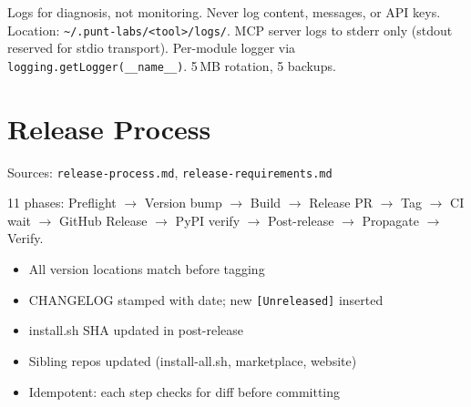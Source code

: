 \documentclass[a4paper,10pt]{article}
\begin{document}
Logs for diagnosis, not monitoring. Never log content, messages, or API keys.
Location: \texttt{\textasciitilde/.punt-labs/<tool>/logs/}. MCP server logs to
stderr only (stdout reserved for stdio transport). Per-module logger via
\texttt{logging.getLogger(\_\_name\_\_)}. 5\,MB rotation, 5 backups.

\section{Release Process}
\label{sec:release}
Sources: \texttt{release-process.md}, \texttt{release-requirements.md}

11 phases: Preflight $\to$ Version bump $\to$ Build $\to$ Release PR $\to$
Tag $\to$ CI wait $\to$ GitHub Release $\to$ PyPI verify $\to$
Post-release $\to$ Propagate $\to$ Verify.

\begin{itemize}
  \item All version locations match before tagging
  \item CHANGELOG stamped with date; new \texttt{[Unreleased]} inserted
  \item install.sh SHA updated in post-release
  \item Sibling repos updated (install-all.sh, marketplace, website)
  \item Idempotent: each step checks for diff before committing
\end{itemize}
\end{document}
